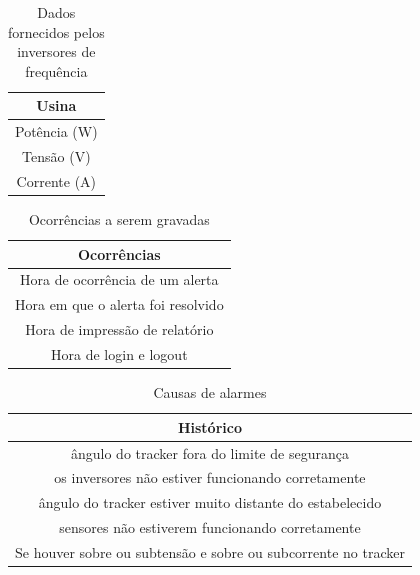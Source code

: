 \documentclass[a4paper,12pt]{article}
\begin{document}
    \begin{table}[htbp]
    \begin{center}
    \begin{tabular}{|c|}
   
    \hline
       \textbf{Usina } \\ \hline
        Potência (W)\\
        Tensão (V) \\
        Corrente (A) \\
    
        \hline
    \end{tabular}
    \caption{Dados fornecidos pelos inversores de frequência }
    \end{center}
    \end{table}
  
     \begin{table}[htbp]
    \begin{center}
    \begin{tabular}{|c|}
   
    \hline
       \textbf{Ocorrências } \\ \hline
        Hora de ocorrência de um alerta\\
        Hora em que o alerta foi resolvido \\
        Hora de impressão de relatório \\
        Hora de login e logout\\
    
        \hline
    \end{tabular}
    \caption{Ocorrências a serem gravadas }
    \end{center}
    \end{table}   



    \begin{table}[htbp]
    \begin{center}
    \begin{tabular}{|c|}
   
    \hline
       \textbf{Histórico } \\ \hline
        ângulo do tracker fora do limite de segurança\\
        os inversores não estiver funcionando corretamente \\
        ângulo do tracker estiver muito distante do estabelecido \\
        sensores não estiverem funcionando corretamente \\
        Se houver sobre ou subtensão e sobre ou subcorrente no tracker \\
    
        \hline
    \end{tabular}
    \caption{Causas de alarmes }
    \end{center}
    \end{table}   
\end{document}
